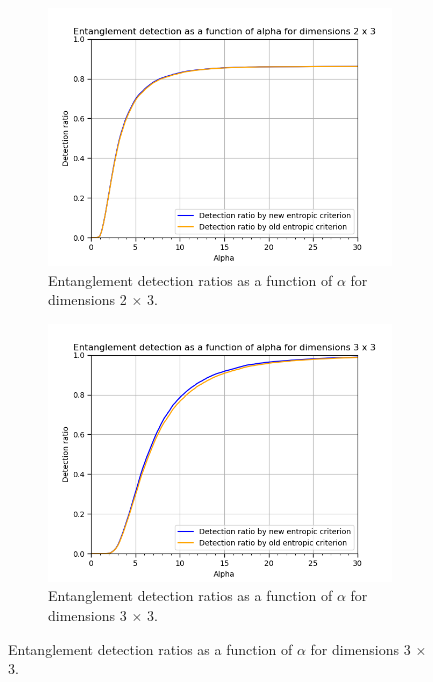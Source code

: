 \begin{figure}[ht] 
  \begin{subfigure}[b]{0.5\linewidth}
    \centering
    \includegraphics[width=\linewidth]{images/renyi_comparison_2_3_30_0.2.png} 
    \caption{Entanglement detection ratios as a function of $\alpha$ for dimensions 2 $\times$ 3.} 
    \label{fig:renyi_2x3} 
    \vspace{2ex}
  \end{subfigure}%
  \begin{subfigure}[b]{0.5\linewidth}
    \centering
    \includegraphics[width=\linewidth]{images/renyi_comparison_3_3_30_0.2.png} 
    \caption{Entanglement detection ratios as a function of $\alpha$ for dimensions 3 $\times$ 3.} 

\end{subfigure}
\end{figure}
